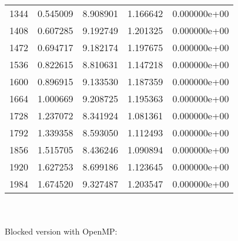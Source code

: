 \documentclass[12pt,letterpaper]{article}
\begin{document}
\begin{tabular}{ |c|c|c|c|c| }
      1344  & 0.545009 &  8.908901 &  1.166642 & 0.000000e+00 \\
      1408  & 0.607285 &  9.192749 &  1.201325 & 0.000000e+00 \\
      1472  & 0.694717 &  9.182174 &  1.197675 & 0.000000e+00 \\
      1536  & 0.822615 &  8.810631 &  1.147218 & 0.000000e+00 \\
      1600  & 0.896915 &  9.133530 &  1.187359 & 0.000000e+00 \\
      1664  & 1.000669 &  9.208725 &  1.195363 & 0.000000e+00 \\
      1728  & 1.237072 &  8.341924 &  1.081361 & 0.000000e+00 \\
      1792  & 1.339358 &  8.593050 &  1.112493 & 0.000000e+00 \\
      1856  & 1.515705 &  8.436246 &  1.090894 & 0.000000e+00 \\
      1920  & 1.627253 &  8.699186 &  1.123645 & 0.000000e+00 \\
      1984  & 1.674520 &  9.327487 &  1.203547 & 0.000000e+00 \\
 
\hline
\end{tabular}
\\\\
\newpage
Blocked version with OpenMP:\\\\
\end{document}
